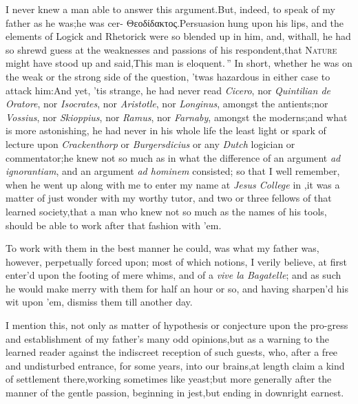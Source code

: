 \documentclass{article}
\begin{document}
I never knew a man able to answer this argument.\tsk  But, indeed, to speak of
my father as he was;\tsk  he was cer-
{\small Θεοδίδακτος}.\tsk  Persuasion hung upon his lips, and the
elements of Logick and\break
Rhetorick were so blended up in him,\tsk\break
and, withall,
he had so shrewd guess at the weaknesses and passions of his
respondent,\tsh  that \textsc{Nature} might have stood up and
said,\tsk  \lqq This man is eloquent.\,”  In short, whether he was
on the weak or the strong side of the que\-stion, ’twas hazardous in either
case to attack him:\tsk  And yet, ’tis strange, he\break
had never read
\textit{Cicero}, nor \textit{Quintilian de Oratore}, nor \textit{Isocrates}, nor
\textit{Aristotle}, nor \textit{Longinus}, amongst the antients;\tsk  nor
\textit{Vossius}, nor \textit{Skioppius}, nor \textit{Ramus},
nor\break
\textit{Farnaby}, amongst the moderns;\tsk  and\break
what is more astonishing, he had never in\break
his whole life the least light or spark of\break
{} lecture upon \textit{Crackenthorp} or \textit{Burgersdicius} or any
\textit{Dutch} logician or commentator;\tsk  he knew not so much as in what the
difference of an argument \textit{ad ignorantiam}, and an argument \textit{ad
hominem} consisted; so that I well remember, when he went up along with me
to enter my name at \textit{Jesus College} in \astiv,\tsk  it was a matter of just
wonder with my worthy tutor, and two or three fellows of that learned
society,\tsk  that a man who knew not so much as the names of his tools,
should be able to work after that fashion with ’em.

To work with them in the best manner he could, was what my
father was, however, perpetually forced upon;\tsh\break 
{}
most of which notions, I verily believe, at
first enter’d upon the footing of mere whims, and of a \textit{vive la
Bagatelle}; and as such he would make merry with them for half
an hour or so, and having sharpen’d his wit upon ’em, dismiss them
till another day.

I mention this, not only as matter of hypothesis or conjecture
upon the pro-\break gress and establishment of my father’s many
odd opinions,\tsk  but as a warning to the learned reader against
the indiscreet reception of such guests, who, after a free and
undisturbed entrance, for some years, into our brains,\tsk  at
length claim a kind of settlement there,\tsh  working
sometimes like yeast;\tsk  but more generally after the manner of
the gentle passion, beginning in jest,\tsk  but ending in
downright earnest.
\end{document}

